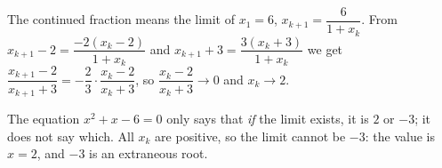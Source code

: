 The continued fraction means the limit of $x_1=6$, $x_{k+1}=\dfrac{6}{1+x_k}$. From $x_{k+1}-2=\dfrac{-2(x_k-2)}{1+x_k}$ and $x_{k+1}+3=\dfrac{3(x_k+3)}{1+x_k}$ we get $\dfrac{x_{k+1}-2}{x_{k+1}+3}=-\dfrac{2}{3}\cdot\dfrac{x_k-2}{x_k+3}$, so $\dfrac{x_k-2}{x_k+3}\to0$ and $x_k\to2$.

The equation $x^2+x-6=0$ only says that \emph{if} the limit exists, it is $2$ or $-3$; it does not say which. All $x_k$ are positive, so the limit cannot be $-3$: the value is $x=\boxed{2}$, and $-3$ is an extraneous root.
